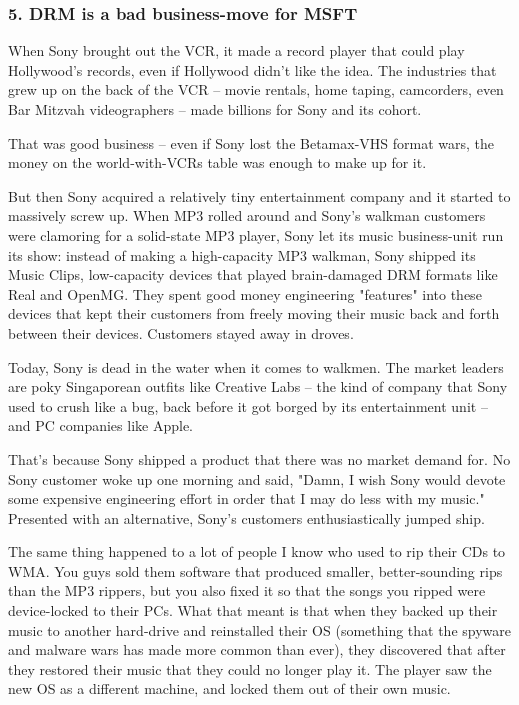 \subsubsection{5. DRM is a bad business-move for MSFT}

When Sony brought out the VCR, it made a record player that could
play Hollywood's records, even if Hollywood didn't like the idea.
The industries that grew up on the back of the VCR -- movie
rentals, home taping, camcorders, even Bar Mitzvah videographers --
made billions for Sony and its cohort.

That was good business -- even if Sony lost the Betamax-VHS format
wars, the money on the world-with-VCRs table was enough to make up
for it.

But then Sony acquired a relatively tiny entertainment company and
it started to massively screw up. When MP3 rolled around and Sony's
walkman customers were clamoring for a solid-state MP3 player, Sony
let its music business-unit run its show: instead of making a
high-capacity MP3 walkman, Sony shipped its Music Clips,
low-capacity devices that played brain-damaged DRM formats like
Real and OpenMG. They spent good money engineering "features" into
these devices that kept their customers from freely moving their
music back and forth between their devices. Customers stayed away
in droves.

Today, Sony is dead in the water when it comes to walkmen. The
market leaders are poky Singaporean outfits like Creative Labs --
the kind of company that Sony used to crush like a bug, back before
it got borged by its entertainment unit -- and PC companies like
Apple.

That's because Sony shipped a product that there was no market
demand for. No Sony customer woke up one morning and said, "Damn, I
wish Sony would devote some expensive engineering effort in order
that I may do less with my music." Presented with an alternative,
Sony's customers enthusiastically jumped ship.

The same thing happened to a lot of people I know who used to rip
their CDs to WMA. You guys sold them software that produced
smaller, better-sounding rips than the MP3 rippers, but you also
fixed it so that the songs you ripped were device-locked to their
PCs. What that meant is that when they backed up their music to
another hard-drive and reinstalled their OS (something that the
spyware and malware wars has made more common than ever), they
discovered that after they restored their music that they could no
longer play it. The player saw the new OS as a different machine,
and locked them out of their own music.

